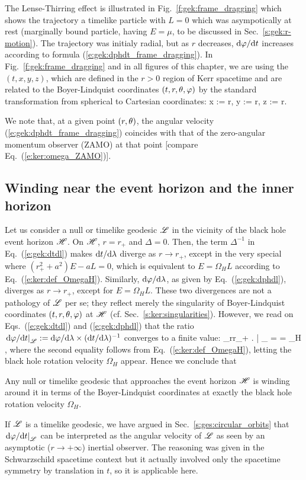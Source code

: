 The Lense-Thirring effect is illustrated in Fig.~\ref{f:gek:frame_dragging}
which shows the trajectory a timelike particle with $L=0$
which was asympotically at rest (marginally bound particle, having $E=\mu$,
to be discussed in Sec.~\ref{s:gek:r-motion}). The trajectory was initialy
radial, but as $r$ decreases, $\mathrm{d}\varphi/\mathrm{d} t$ increases according to formula
(\ref{e:gek:dphdt_frame_dragging}).
In Fig.~\ref{f:gek:frame_dragging} and in all figures of this chapter, we are
using the 
$(t,x,y,z)$, which are
defined in the $r>0$ region of Kerr spacetime and are related to the
Boyer-Lindquist coordinates $(t,r,\theta,\varphi)$ by the standard transformation
from spherical to Cartesian coordinates:
\be \label{e:gek:Cartesian_BL}
    x := r\sin\th\cos\ph,\qquad
    y := r\sin\th\sin\ph,\qquad
    z := r\cos\th .
\ee

We note that, at a given point $(r,\theta)$, the angular velocity (\ref{e:gek:dphdt_frame_dragging})
coincides with that of the zero-angular momentum observer (ZAMO) at that point
[compare Eq.~(\ref{e:ker:omega_ZAMO})].

\subsection{Winding near the event horizon and the inner horizon}

Let us consider a null or timelike geodesic $\mathscr{L}$ in the vicinity of the
black hole event horizon $\mathscr{H}$.
On $\mathscr{H}$, $r=r_+$ and $\Delta = 0$. Then, the term
$\Delta^{-1}$ in Eq.~(\ref{e:gek:dtdl}) makes $\mathrm{d} t/\mathrm{d}\lambda$ diverge as
$r\to r_+$, except in the very special where $(r_+^2 + a^2)E - aL = 0$, which
is equivalent to $E = \Omega_H L$ according to Eq.~(\ref{e:ker:def_OmegaH}).
Similarly, $\mathrm{d}\varphi/\mathrm{d}\lambda$, as given by Eq.~(\ref{e:gek:dphdl}), diverges
as $r\to r_+$, except for $E = \Omega_H L$. These two divergences are not
a pathology of $\mathscr{L}$ per se; they
reflect merely the singularity of Boyer-Lindquist coordinates $(t,r,\theta,\varphi)$ at $\mathscr{H}$
(cf.  Sec.~\ref{s:ker:singularities}). However, we read on Eqs.~(\ref{e:gek:dtdl}) and
(\ref{e:gek:dphdl}) that the ratio
$\left. \mathrm{d}\varphi/\mathrm{d} t \right| _{\mathscr{L}} := \mathrm{d}\varphi/\mathrm{d}\lambda \times (\mathrm{d} t/\mathrm{d}\lambda)^{-1}$
converges to a finite value:
\be \label{e:gek:lim_dphdt_Hor}
    \lim_{r\to r_+} \left.  \right| _{\Li} =  = \Omega_H ,
\ee
where the second equality follows from Eq.~(\ref{e:ker:def_OmegaH}), letting
the black hole rotation velocity $\Omega_H$ appear.
Hence we conclude that
\begin{greybox}
Any null or timelike geodesic that approaches the event horizon $\mathscr{H}$
is winding around it in terms of the Boyer-Lindquist coordinates at exactly the black hole rotation velocity $\Omega_H$.
\end{greybox}
If $\mathscr{L}$ is a timelike geodesic, we have argued in Sec.~\ref{s:ges:circular_orbits}
that $\left. \mathrm{d}\varphi/\mathrm{d} t \right| _{\mathscr{L}}$ can be interpreted as the angular velocity of
$\mathscr{L}$ as seen by an asymptotic ($r\to +\infty$) inertial observer. The reasoning was
given in the Schwarzschild spacetime context but it actually  involved only
the spacetime symmetry by translation in $t$, so it is applicable here.


